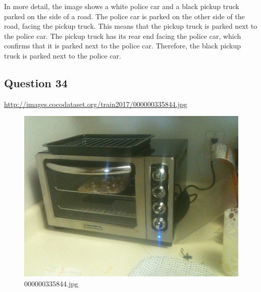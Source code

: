 \begin{enumerate}
        In more detail, the image shows a white police car and a black pickup truck parked on the side of a road. The police car is parked on the other side of the road, facing the pickup truck. This means that the pickup truck is parked next to the police car. The pickup truck has its rear end facing the police car, which confirms that it is parked next to the police car. Therefore, the black pickup truck is parked next to the police car.
    \end{enumerate}
\subsection*{Question 34}
\url{http://images.cocodataset.org/train2017/000000335844.jpg}
    \begin{figure}[h]
        \centering
        \includegraphics[width=0.8\linewidth]{../image set/easy/000000335844.jpg}
        \caption{000000335844.jpg}
    \end{figure}
